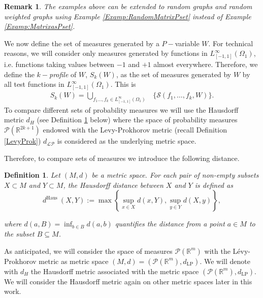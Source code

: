 \documentclass[11pt]{article}
\newtheorem{definition}[theorem]{Definition}
\newtheorem{remark}[theorem]{Remark}
\newcommand{\cP}{{\mathcal P}}  %
\begin{document}
\begin{remark}\label{remarkRandGraphRepPset}
The examples above can be extended to random graphs and random weighted graphs using Example \ref{Examp:RandomMatrixPset} instead of Example \ref{Examp:MatrixasPset}.
\end{remark}
We now define the set of measures generated by a $P-$variable $W.$ For technical reasons, we will consider only measures generated by functions in $L_{[-1,1]}^{\infty}(\Omega_1)$, i.e. functions taking values between $-1$ and $+1$ almost everywhere. Therefore, we define the $k-$\emph{profile} of $W$,  $S_k(W)$, as the set of measures generated by $W$ by all test functions in  $L_{[-1,1]}^{\infty}(\Omega_1)$. This is 
\begin{equation}\label{Eq:DefKProfile}
    \begin{aligned}
S_k(W)=\bigcup_{f_1\ldots,f_k\in L_{[-1,1]}^{\infty}(\Omega_1)}&\{\mathcal{S}
(f_1,\ldots, f_k,W)\}.
\end{aligned}
\end{equation}
To compare different sets of probability measures we will use the Hausdorff metric $d_H$ (see Definition	\ref{HausdorffDist} below) where the space of probability measures $\mathcal{P}(\mathbb{R}^{2k+1})$ endowed with the Levy-Prokhorov metric (recall Definition \ref{LevyProk}) $d_{\mathcal{LP}}$ is considered as the underlying metric space. 

Therefore, to compare sets of measures we introduce the following distance.

\begin{definition}\label{HausdorffDist}
Let $(M, d)$ be a metric space. For each pair of non-empty subsets $X \subset M$ and $Y \subset M$, the \emph{Hausdorff distance} between $X$ and $Y$ is defined as
$$
d^{\text {Haus }}(X, Y):=\max \left\{\sup _{x \in X} d(x, Y), \sup _{y \in Y} d(X, y)\right\},
$$

 where $d(a, B)=\inf _{b \in B} d(a, b)$ quantifies the distance from a point $a \in M$ to the subset $B \subseteq M$.
\end{definition}

As anticipated, we will consider the space of measures $\cP(\mathbb{R}^{m})$ with the Lévy-Prokhorov metric as metric space $(M,d)=(\cP(\mathbb{R}^{m}),d_{\mathrm{LP}})$. We will denote with $d_H$ the Hausdorff metric associated with the metric space $(\cP(\mathbb{R}^{m}),d_{\mathrm{LP}}).$ We will consider the Hausdorff metric again on other metric spaces later in this work.
\end{document}
